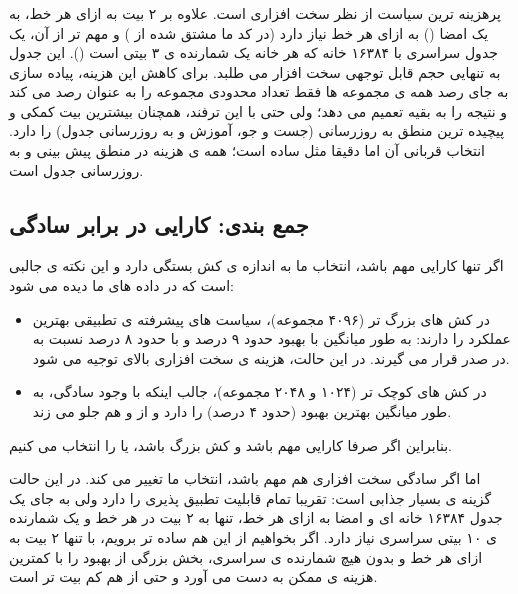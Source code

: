 \documentclass[12pt,a4paper]{article}
\begin{document}
\subsubsection{}

پرهزینه ترین سیاست از نظر سخت افزاری است. علاوه بر ۲ بیت  به ازای هر خط، به یک امضا () به ازای هر خط نیاز دارد (در کد ما مشتق شده از ) و مهم تر از آن، یک جدول سراسری  با ۱۶۳۸۴ خانه که هر خانه یک شمارنده ی ۳ بیتی است (). این جدول به تنهایی حجم قابل توجهی سخت افزار می طلبد. برای کاهش این هزینه، پیاده سازی به جای رصد همه ی مجموعه ها فقط تعداد محدودی مجموعه را به عنوان  رصد می کند و نتیجه را به بقیه تعمیم می دهد؛ ولی حتی با این ترفند،  همچنان بیشترین بیت کمکی و پیچیده ترین منطق به روزرسانی (جست و جو، آموزش و به روزرسانی جدول) را دارد. انتخاب قربانی آن اما دقیقا مثل  ساده است؛ همه ی هزینه در منطق پیش بینی و به روزرسانی جدول است.

\subsection{جمع بندی: کارایی در برابر سادگی}

اگر تنها کارایی مهم باشد، انتخاب ما به اندازه ی کش بستگی دارد و این نکته ی جالبی است که در داده های ما دیده می شود:

\begin{itemize}
  \item در کش های بزرگ تر (۴۰۹۶ مجموعه)، سیاست های پیشرفته ی تطبیقی بهترین عملکرد را دارند: به طور میانگین  با بهبود حدود ۹ درصد و  با حدود ۸ درصد نسبت به  در صدر قرار می گیرند. در این حالت، هزینه ی سخت افزاری بالای  توجیه می شود.
  \item در کش های کوچک تر (۱۰۲۴ و ۲۰۴۸ مجموعه)، جالب اینکه  با وجود سادگی، به طور میانگین بهترین بهبود (حدود ۴ درصد) را دارد و از  و  هم جلو می زند.
\end{itemize}

بنابراین اگر صرفا کارایی مهم باشد و کش بزرگ باشد،  یا  را انتخاب می کنیم.

اما اگر سادگی سخت افزاری هم مهم باشد، انتخاب ما تغییر می کند. در این حالت  گزینه ی بسیار جذابی است: تقریبا تمام قابلیت تطبیق پذیری  را دارد ولی به جای یک جدول ۱۶۳۸۴ خانه ای و امضا به ازای هر خط، تنها به ۲ بیت در هر خط و یک شمارنده ی ۱۰ بیتی سراسری نیاز دارد. اگر بخواهیم از این هم ساده تر برویم،  با تنها ۲ بیت به ازای هر خط و بدون هیچ شمارنده ی سراسری، بخش بزرگی از بهبود را با کمترین هزینه ی ممکن به دست می آورد و حتی از  هم کم بیت تر است.
\end{document}

